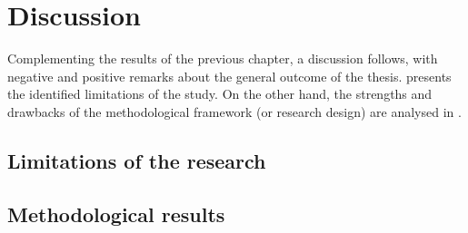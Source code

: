 \chapter{Discussion}
\label{c:discussion}

Complementing the results of the previous chapter, a discussion follows, with negative and positive remarks about the general outcome of the thesis.  presents the identified limitations of the study. On the other hand, the strengths and drawbacks of the methodological framework (or research design) are analysed in .

\section{Limitations of the research}
\label{s:discussion:limitations}


\section{Methodological results}
\label{s:discussion:methodological-results}


%